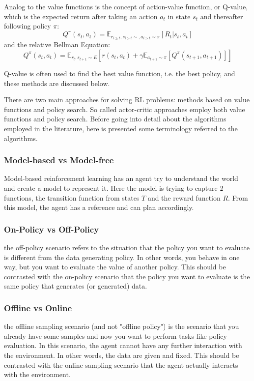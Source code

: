 Analog to the value functions is the concept of action-value function, or Q-value, which is the expected return after taking an action \(a_t\) in state \(s_t\) and thereafter following policy \(\pi\):
\[Q^\pi(s_t,a_t)=\mathbb{E}_{r_{i \geq t},s_{i>t} \sim ,a_{i>t} \sim \pi}[R_t|s_t,a_t]\]
and the relative Bellman Equation:
\[Q^\pi(s_t,a_t)=\mathbb{E}_{r_t,s_{t+1} \sim E }\left[ r(s_t,a_t) + \gamma \mathbb{E}_{a_{t+1} \sim \pi}\left[Q^\pi (s_{t+1},a_{t+1})\right]\right]\]

Q-value is often used to find the best value function, i.e. the best policy, and these methods are discussed below.



There are two main approaches for solving RL problems: methods based on value functions and policy search. So called actor-critic approaches employ both value functions and policy search.
Before going into detail about the algorithms employed in the literature, here is presented some terminology referred to the algorithms.

\subsubsection{Model-based vs Model-free}
 Model-based reinforcement learning has an agent try to understand the world and create a model to represent it. Here the model is trying to capture 2 functions, the transition function from states $T$ and the reward function $R$. From this model, the agent has a reference and can plan accordingly.
\subsubsection{On-Policy vs Off-Policy}
the off-policy scenario refers to the situation that the policy you want to evaluate is different from the data generating policy. In other words, you behave in one way, but you want to evaluate the value of another policy. This should be contrasted with the on-policy scenario that the policy you want to evaluate is the same policy that generates (or generated) data.
\subsubsection{Offline vs Online}
the offline sampling scenario (and not "offline policy") is the scenario that you already have some samples and now you want to perform tasks like policy evaluation. In this scenario, the agent cannot have any further interaction with the environment. In other words, the data are given and fixed. This should be contrasted with the online sampling scenario that the agent actually interacts with the environment.


